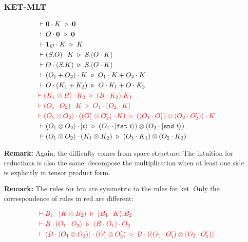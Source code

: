 \subsubsection*{\textsf{KET-MLT}}
\begin{align*}
  & \vdash \textbf{0} \cdot K \ \triangleright\  \textbf{0} \\
  & \vdash O \cdot \mathbf{0} \ \triangleright\  \mathbf{0} \\
  & \vdash \textbf{1}_\mathcal{O} \cdot K \ \triangleright\  K \\
  & \vdash (S.O) \cdot K \ \triangleright\  S.(O \cdot K) \\
  & \vdash O \cdot (S.K) \ \triangleright\  S.(O \cdot K) \\
  & \vdash (O_1 + O_2) \cdot K \ \triangleright\  O_1 \cdot K + O_2 \cdot K \\
  & \vdash O \cdot (K_1 + K_2) \ \triangleright\  O \cdot K_1 + O \cdot K_2 \\
  & \textcolor{red}{\vdash (K_1 \otimes B) \cdot K_2 \ \triangleright\  (B \cdot K_2).K_1} \\
  & \textcolor{red}{\vdash (O_1 \cdot O_2) \cdot K \ \triangleright\  O_1 \cdot (O_2 \cdot K)} \\
  & \textcolor{red}{\vdash (O_1 \otimes O_2) \cdot ((O_1' \otimes O_2') \cdot K) \ \triangleright\  ((O_1 \cdot O_1') \otimes (O_2 \cdot O_2')) \cdot K} \\
  & \vdash (O_1 \otimes O_2) \cdot |t\rangle \ \triangleright\  (O_1 \cdot |\texttt{fst}\ t\rangle) \otimes (O_2 \cdot |\texttt{snd}\ t\rangle) \\
  & \vdash (O_1 \otimes O_2) \cdot (K_1 \otimes K_2) \ \triangleright\  (O_1 \cdot K_1) \otimes (O_2 \cdot K_2)
\end{align*}

\textbf{Remark: } Again, the difficulty comes from space structure. The intuition for reductions is also the same: decompose the multiplication when at least one side is explicitly in tensor product form.


\textbf{Remark: } The rules for bra are symmetric to the rules for ket. Only the correspondence of rules in red are different:

\begin{align*}
  & \textcolor{red}{\vdash B_1 \cdot (K \otimes B_2) \ \triangleright\  (B_1 \cdot K).B_2} \\
  & \textcolor{red}{\vdash B \cdot (O_1 \cdot O_2) \ \triangleright\  (B \cdot O_1) \cdot O_2} \\
  & \textcolor{red}{\vdash (B \cdot (O_1 \otimes O_2)) \cdot (O_1' \otimes O_2') \ \triangleright\  B \cdot ((O_1 \cdot O_1') \otimes (O_2 \cdot O_2'))}
\end{align*}

